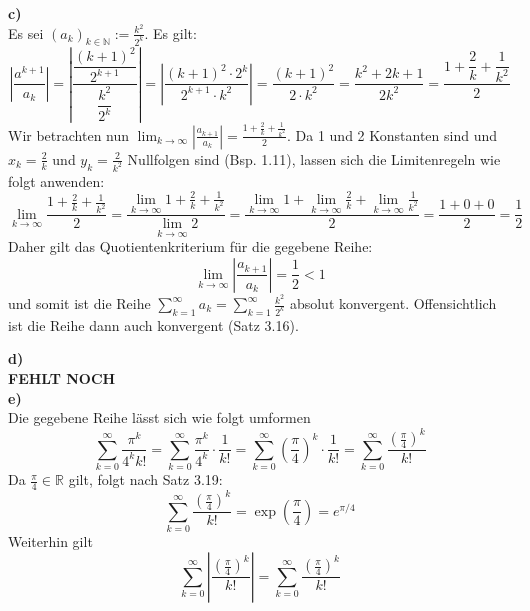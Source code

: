 \documentclass[a4paper,graphics,11pt]{article}
\begin{document}
\textbf{c)}\\[5pt]
Es sei $\displaystyle(a_k)_{k \in \mathbb{N}} := \frac{k^2}{2^k}$. Es gilt:
$$
    \left|\frac{a^{k+1}}{a_k}\right|
    = \left|\frac{\dfrac{(k+1)^2}{2^{k+1}}}{{\dfrac{k^2}{2^k}}}\right|
    = \left|\frac{(k+1)^2 \cdot 2^k}{2^{k+1}\cdot k^2}\right|
    = \frac{(k+1)^2}{2\cdot k^2}
    = \frac{k^2+2k+1}{2k^2}
    = \frac{1+\dfrac{2}{k}+\dfrac{1}{k^2}}{2}
$$
Wir betrachten nun $\displaystyle\lim_{k \to \infty}\limits \left|\frac{a_{k+1}}{a_k}\right|
= \frac{1+\frac{2}{k}+\frac{1}{k^2}}{2}$. Da 1 und 2 Konstanten sind und
$x_k=\frac{2}{k}$ und $y_k=\frac{2}{k^2}$ Nullfolgen sind (Bsp. 1.11), lassen sich
die Limitenregeln wie folgt anwenden:
$$
    \lim_{k \to \infty} \frac{1+\frac{2}{k}+\frac{1}{k^2}}{2}
    = \frac{\lim_{k\to\infty}\limits1+\frac{2}{k}+\frac{1}{k^2}}{\lim_{k \to \infty}\limits 2}
    = \frac{\lim_{k \to \infty}\limits 1 + \lim_{k \to \infty}\limits \frac{2}{k}+ \lim_{k \to \infty}\limits \frac{1}{k^2}}{2}
    = \frac{1+0+0}{2} = \frac{1}{2}
$$
Daher gilt das Quotientenkriterium für die gegebene Reihe:
$$
    \lim_{k \to \infty} \left|\frac{a_{k+1}}{a_k}\right| = \frac{1}{2} < 1
$$
und somit ist die Reihe $\displaystyle\sum_{k=1}^{\infty} a_k = \sum_{k=1}^{\infty} \frac{k^2}{2^k}$
absolut konvergent. Offensichtlich ist die Reihe dann auch konvergent (Satz 3.16).

\textbf{d)}\\[5pt]
\textbf{FEHLT NOCH}\\
\textbf{e)}\\[5pt]
Die gegebene Reihe lässt sich wie folgt umformen
$$
    \sum_{k=0}^{\infty} \frac{\pi^k}{4^kk!}
    = \sum_{k=0}^{\infty} \frac{\pi^k}{4^k}\cdot \frac{1}{k!}
    = \sum_{k=0}^{\infty} \left(\frac{\pi}{4}\right)^k \cdot \frac{1}{k!}
    = \sum_{k=0}^{\infty} \frac{\left(\frac{\pi}{4}\right)^k}{k!}
$$
Da $\frac{\pi}{4} \in \mathbb{R}$ gilt, folgt nach Satz 3.19:
$$
    \sum_{k=0}^{\infty} \frac{\left(\frac{\pi}{4}\right)^k}{k!}
    = \exp\left(\frac{\pi}{4}\right)= e^{\pi/4}
$$
Weiterhin gilt
$$
    \sum_{k=0}^{\infty} \left|\frac{\left(\frac{\pi}{4}\right)^k}{k!} \right|
    = \sum_{k=0}^{\infty}\frac{\left(\frac{\pi}{4}\right)^k}{k!} 
$$
\end{document}
